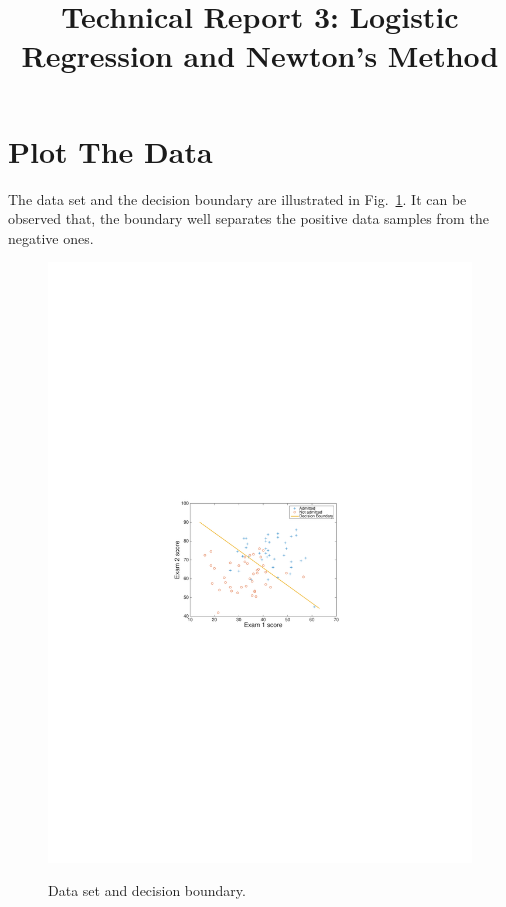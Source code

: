 \documentclass[10pt,a4paper]{article}
\date{}
\begin{document}
\title{Technical Report 3: Logistic Regression and Newton's Method}

\maketitle

\section{Plot The Data}
%
  The data set and the decision boundary are illustrated in Fig.~\ref{fig:data}. It can be observed that, the boundary well separates the positive data samples from the negative ones.
  \begin{figure}[htb!]
  \centering
    \includegraphics[width=.7\columnwidth]{data} \\ %
  \caption{Data set and decision boundary.}
  \label{fig:data}
  \end{figure}
\end{document}
